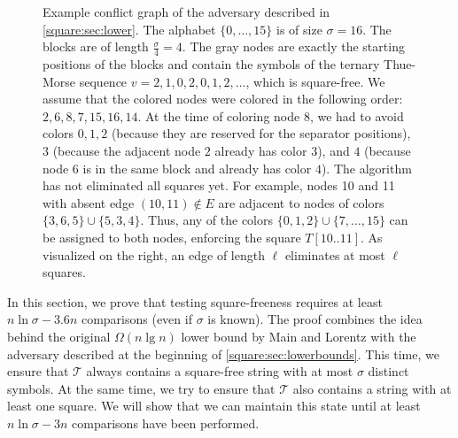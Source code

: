 \begin{figure}
\caption{Example conflict graph of the adversary described in \cref{square:sec:lower}. 
The alphabet $\{0, \dots, 15\}$ is of size $\sigma = 16$. 
The blocks are of length $\frac \sigma 4 = 4$. 
The gray nodes are exactly the starting positions of the blocks and contain the symbols of the ternary Thue-Morse sequence $v = 2,1,0,2,0,1,2,\dots$, which is square-free. 
We assume that the colored nodes were colored in the following order: $2,6,8,7,15,16,14$. 
At the time of coloring node $8$, we had to avoid colors 
$0,1,2$ (because they are reserved for the separator positions), 
$3$ (because the adjacent node $2$ already has color $3$), and 
$4$ (because node $6$ is in the same block and already has color $4$). 
The algorithm has not eliminated all squares yet. 
For example, nodes 10 and 11 with absent edge $(10, 11) \notin E$ are adjacent to nodes of colors $\{3,6,5\} \cup \{5,3,4\}$. 
Thus, any of the colors $\{0,1,2\} \cup \{7, \dots, 15\}$ can be assigned to both nodes, enforcing the square $T[10..11]$. 
As visualized on the right, an edge of length $\ell$ eliminates at most $\ell$ squares.} 
\label{fig:lbsquarefree}
\end{figure}

In this section, we prove that testing square-freeness requires at least $n \ln \sigma - 3.6n$ comparisons (even if $\sigma$ is known). 
The proof combines the idea behind the original $\Omega(n \lg n)$ lower bound by Main and Lorentz \cite{Main1984} with the adversary described at the beginning of \cref{square:sec:lowerbounds}.
This time, we ensure that $\mathcal T$ always contains a square-free string with at most $\sigma$ distinct symbols.
At the same time, we try to ensure that $\mathcal T$ also contains a string with at least one square.
We will show that we can maintain this state until at least $n \ln \sigma -3n$ comparisons have been performed.

